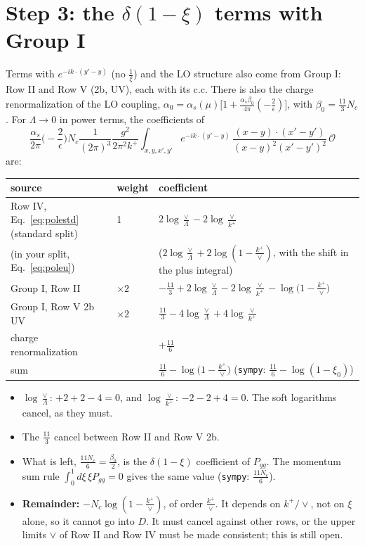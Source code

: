 \documentclass[10pt]{article}
\numberwithin{equation}{section}
\newcommand{\OO}{\mathcal O}
\newcommand{\preLO}{\frac{1}{(2\pi)^3}\frac{g^2}{2\pi^2k^+}}
\newcommand{\XX}{\frac{(x-y)\cdot(x'-y')}{(x-y)^{2}(x'-y')^{2}}}
\newcommand{\phone}{e^{-ik\cdot(y'-y)}}
\begin{document}
\section{Step 3: the \texorpdfstring{$\delta(1-\xi)$}{delta(1-xi)} terms with Group I}\label{sec:delta}
Terms with $\phone$ (no $\frac1\xi$) and the LO structure also come from Group I: Row II and Row V (2b, UV), each with its c.c. There is also the charge renormalization of the LO coupling, $\alpha_0=\alpha_s(\mu)\big[1+\frac{\alpha_s\beta_0}{4\pi}(-\frac2\epsilon)\big]$, with $\beta_0=\frac{11}{3}N_c$. For $\Lambda\to0$ in power terms, the coefficients of
\begin{equation*}
\frac{\alpha_s}{2\pi}\Big(-\frac{2}{\epsilon}\Big)N_c\preLO\int_{x,y,x',y'}\phone\,\XX\,\OO
\end{equation*}
are:
\begin{table}[H]\centering\small
\renewcommand{\arraystretch}{1.3}
\begin{tabular}{@{}lll@{}}\toprule
source & weight & coefficient\\\midrule
Row IV, Eq.~\eqref{eq:polestd} (standard split) & 1 & $2\log\frac{\vee}{\Lambda}-2\log\frac{\vee}{k^+}$\\
\quad (in your split, Eq.~\eqref{eq:poleu}) & & \quad ($2\log\frac{\vee}{\Lambda}+2\log(1-\frac{k^+}{\vee})$, with the shift in the plus integral)\\
Group I, Row II & $\times2$ & $-\frac{11}{3}+2\log\frac{\vee}{\Lambda}-2\log\frac{\vee}{k^+}-\log\big(1-\frac{k^+}{\vee}\big)$\\
Group I, Row V 2b UV & $\times2$ & $\frac{11}{3}-4\log\frac{\vee}{\Lambda}+4\log\frac{\vee}{k^+}$\\
charge renormalization & & $+\frac{11}{6}$\\\midrule
sum & & $\frac{11}{6}-\log\big(1-\frac{k^+}{\vee}\big)$ \quad(\texttt{sympy}: $\frac{11}{6}-\log(1-\xi_0)$)\\\bottomrule
\end{tabular}
\end{table}
\begin{itemize}
\item $\log\frac{\vee}{\Lambda}$: $+2+2-4=0$, and $\log\frac{\vee}{k^+}$: $-2-2+4=0$. The soft logarithms cancel, as they must.
\item The $\frac{11}{3}$ cancel between Row II and Row V 2b.
\item What is left, $\frac{11N_c}{6}=\frac{\beta_0}{2}$, is the $\delta(1-\xi)$ coefficient of $P_{gg}$. The momentum sum rule $\int_0^1d\xi\,\xi P_{gg}=0$ gives the same value (\texttt{sympy}: $\frac{11N_c}{6}$).
\item \textbf{Remainder:} $-N_c\log(1-\frac{k^+}{\vee})$, of order $\frac{k^+}{\vee}$. It depends on $k^+/\vee$, not on $\xi$ alone, so it cannot go into $D$. It must cancel against other rows, or the upper limits $\vee$ of Row II and Row IV must be made consistent; this is still open.
\end{itemize}
\end{document}
